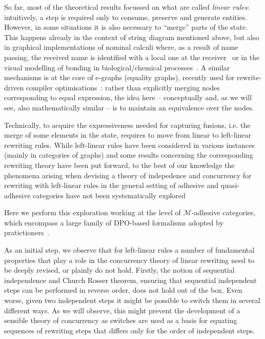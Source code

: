 \documentclass[a4paper,UKenglish,cleveref,pdftex, thm-restate,numberwithinsect,anonymous]{lipics}
\begin{document}
So far, most of the theoretical results focussed on what are called \emph{linear rules}: 
intuitively, a step is required only to consume, preserve and generate entities. 
However, in some situations it is also necessary to ``merge'' parts of the state. 
This happens already in the context of string diagram mentioned above, but also 
in graphical implementations of nominal calculi where, as a result of name passing, 
the received name is identified with a local one at the
receiver~\cite{CVY:ESSPE,Gad07} or in the visual modelling of bonding in
biological/chemical processes~\cite{PUY:MBPE}. A similar mechanisms is
at the core of e-graphs (equality graphs), recently used for
rewrite-driven compiler optimisations~\cite{WNW:egg}: rather than
explicitly merging nodes corresponding to equal expression, the idea
here -- conceptually and, as we will see, also mathematically similar --
is to maintain an equivalence %
over the nodes.  


Technically, to acquire the expressiveness needed for capturing
fusions, i.e. the merge of some elements in the state, requires to
move from linear to left-linear rewriting rules. While left-linear
rules have been considered in various instances (mainly in categories
of graphs) and some results concerning the corresponding rewriting
theory have been put forward, to the best of our knowledge the
phenomena arising when devising a theory of indepedence and
concurrency for rewriting with left-linear rules in the general
setting of adhesive and quasi-adhesive categories
have not been systematically
explored~\cite{Ehrig1976,EHP:BRfTToHLRS,baldan2011adhesivity} 

Here we perform this exploration working at the level of $\mathcal{M}$-adhesive categories, 
which encompass a large family of DPO-based formalisms adopted by pratictioners~\cite{xxx}. 

As an initial step, %
we observe that for
left-linear rules a number of fundamental properties that play a role
in the concurrency theory of linear rewriting need to be deeply revised, or
plainly do not hold.
%
Firstly, the notion of sequential independence and Church Rosser
theorem, ensuring that sequential independent steps can be performed
in reverse order, does not hold out of the box. Even worse, given two
independent steps it might be possible to switch them in several
different ways. As we will observe, this might prevent the development
of a sensible theory of concurrency as switches are used as a basis
for equating sequences of rewriting steps that differs only for the order of independent
steps.
\end{document}
